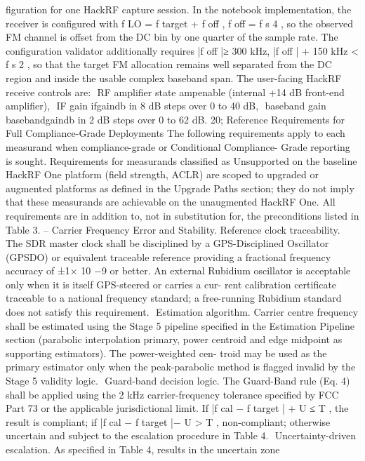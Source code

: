 \documentclass[11pt,a4paper]{article}
\begin{document}
{\begin{itemize}
figuration for one HackRF capture session.  In the notebook implementation, the receiver is
configured with
f
LO
= f
target
+ f
off
,   f
off
=
f
s
4
,
so the observed FM channel is offset from the DC bin by one quarter of the sample rate.  The
configuration validator additionally requires
|f
off
|≥ 300 kHz,  |f
off
| + 150 kHz <
f
s
2
,
so that the target FM allocation remains well separated from the DC region and inside the
usable complex baseband span.
The user-facing HackRF receive controls are:
  RF amplifier state ampenable (internal +14 dB front-end amplifier),
  IF gain ifgaindb in 8 dB steps over 0 to 40 dB,
  baseband gain basebandgaindb in 2 dB steps over 0 to 62 dB.
20; Reference Requirements for Full Compliance-Grade Deployments
The following requirements apply to each measurand when compliance-grade or Conditional Compliance-
Grade reporting is sought.  Requirements for measurands classified as Unsupported on the baseline
HackRF One platform (field strength, ACLR) are scoped to upgraded or augmented platforms as
defined in the Upgrade Paths section; they do not imply that these measurands are achievable on
the unaugmented HackRF One.  All requirements are in addition to, not in substitution for, the
preconditions listed in Table 3.
– Carrier Frequency Error and Stability.  Reference clock traceability.  The SDR master clock
shall be disciplined by a GPS-Disciplined Oscillator (GPSDO) or equivalent traceable
reference providing a fractional frequency accuracy of ±1× 10
−9
or better.  An external
Rubidium  oscillator  is  acceptable  only  when  it  is  itself  GPS-steered  or  carries  a  cur-
rent  calibration  certificate  traceable  to  a  national  frequency  standard;  a  free-running
Rubidium standard does not satisfy this requirement.
  Estimation  algorithm.   Carrier  centre  frequency  shall  be  estimated  using  the  Stage  5
pipeline  specified  in  the  Estimation  Pipeline  section  (parabolic  interpolation  primary,
power centroid and edge midpoint as supporting estimators).  The power-weighted cen-
troid  may  be  used  as  the  primary  estimator  only  when  the  peak-parabolic  method  is
flagged invalid by the Stage 5 validity logic.
  Guard-band decision logic.  The Guard-Band rule (Eq. 4) shall be applied using the 2 kHz
carrier-frequency  tolerance  specified  by  FCC  Part  73  or  the  applicable  jurisdictional
limit.   If |f
cal
− f
target
| + U ≤ T ,  the  result  is  compliant;  if |f
cal
− f
target
|− U > T ,
non-compliant; otherwise uncertain and subject to the escalation procedure in Table 4.
  Uncertainty-driven  escalation.   As  specified  in  Table  4,  results  in  the  uncertain  zone

\end{itemize}}
\end{document}
